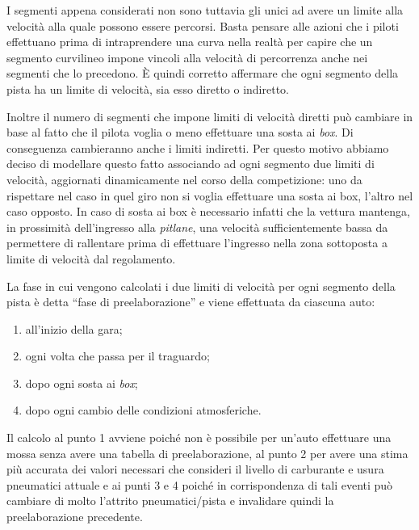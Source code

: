 I segmenti appena considerati non sono tuttavia gli unici ad avere un limite alla velocità alla quale possono essere percorsi. Basta pensare alle azioni che i piloti effettuano prima di intraprendere una curva nella realtà per capire che un segmento curvilineo impone vincoli alla velocità di percorrenza anche nei segmenti che lo precedono. \`E quindi corretto affermare che ogni segmento della pista ha un limite di velocità, sia esso diretto o indiretto.

Inoltre il numero di segmenti che impone limiti di velocità diretti può cambiare in base al fatto che il pilota voglia o meno effettuare una sosta ai \textit{box}. Di conseguenza cambieranno anche i limiti indiretti. Per questo motivo abbiamo deciso di modellare questo fatto associando ad ogni segmento due limiti di velocità, aggiornati dinamicamente nel corso della competizione: uno da rispettare nel caso in quel giro non si voglia effettuare una sosta ai box, l'altro nel caso opposto. In caso di sosta ai box è necessario infatti che la vettura mantenga, in prossimità dell'ingresso alla \textit{pitlane}, una velocità sufficientemente bassa da permettere di rallentare prima di effettuare l'ingresso nella zona sottoposta a limite di velocità dal regolamento.

La fase in cui vengono calcolati i due limiti di velocità per ogni segmento della pista è detta ``fase di preelaborazione'' e viene effettuata da ciascuna auto:
\begin{enumerate}
\item all'inizio della gara;
\item ogni volta che passa per il traguardo;
\item dopo ogni sosta ai \textit{box};
\item dopo ogni cambio delle condizioni atmosferiche.
\end{enumerate}
Il calcolo al punto 1 avviene poiché non è possibile per un'auto effettuare una mossa senza avere una tabella di preelaborazione, al punto 2 per avere una stima più accurata dei valori necessari che consideri il livello di carburante e usura pneumatici attuale e ai punti 3 e 4 poiché in corrispondenza di tali eventi può cambiare di molto l'attrito pneumatici/pista e invalidare quindi la preelaborazione precedente.


